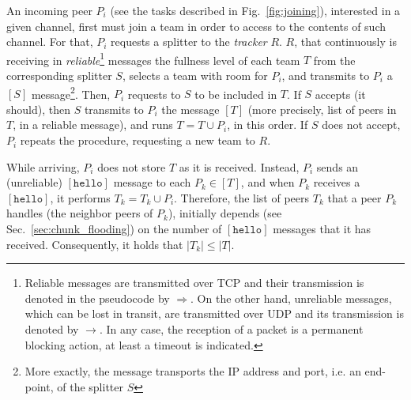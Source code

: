 
\label{sec:peer_joining}
\begin{figure*}
   \caption{Tasks involved in a peer
    joining. $P^t_i$ is the incoming peer, and $P^t_k$ is a peer that
    is already in the team. $R$ represents the tracker, and $S^t$ the
    splitter of the team $T^t$ to which $P^t_k$ belongs, and $P^t_i$
    will be added.\label{fig:joining}}
\end{figure*}
An incoming peer $P_i$ (see the tasks described in
Fig.~\ref{fig:joining}), interested in a given channel, first must
join a team in order to access to the contents of such channel. For
that, $P_i$ requests a splitter to the \emph{tracker} $R$. $R$, that
continuously is receiving in \emph{reliable}\footnote{Reliable
  messages are transmitted over TCP and their transmission is denoted
  in the pseudocode by $\Rightarrow$. On the other hand, unreliable
  messages, which can be lost in transit, are transmitted over UDP and
  its transmission is denoted by $\rightarrow$. In any case, the
  reception of a packet is a permanent blocking action, at least a
  timeout is indicated.}  messages the fullness level of each team
$T$ from the corresponding splitter $S$, selects a team with room
for $P_i$, and transmits to $P_i$ a $[S]$ message\footnote{More
  exactly, the message transports the IP address and port, i.e. an
  end-point, of the splitter $S$}. Then, $P_i$ requests to $S$
to be included in $T$. If $S$ accepts (it should), then $S$
transmits to $P_i$ the message $[T]$ (more precisely, list of
peers in $T$, in a reliable message), and runs $T = T \cup
P_i$, in this order. If $S$ does not accept, $P_i$ repeats the
procedure, requesting a new team to $R$.


While arriving, $P_i$ does not store $T$ as it is
received. Instead, $P_i$ sends an
(unreliable) $[\mathtt{hello}]$ message to each $P_k\in [T]$, and when
$P_k$ receives a $[\mathtt{hello}]$, it performs $T_k = T_k \cup
P_i$. Therefore, the list of peers $T_k$ that a peer $P_k$
handles (the neighbor peers of $P_k$), initially depends (see
Sec.~\ref{sec:chunk_flooding}) on the number of $[\mathtt{hello}]$
messages that it has received. Consequently, it holds that
$|T_k| \le |T|$.


